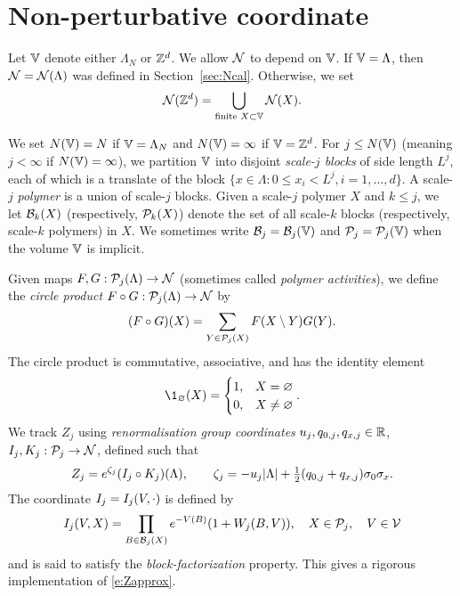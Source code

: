 
\section{Non-perturbative coordinate}
\label{sec:rgcoord}

Let $\mathbb{V}$ denote either $\Lambda_N$ or ${ {{\mathbb Z}}^d }$. We allow $\mathcal{N}$ to depend on
$\mathbb{V}$. If $\mathbb{V} = \Lambda$, then $\mathcal{N} = \mathcal{N}(\Lambda)$ was defined in
Section~\ref{sec:Ncal}. Otherwise, we set
\begin{equation}
\mathcal{N}({ {{\mathbb Z}}^d }) = \bigcup_{\text{finite } X \subset \mathbb{V}} \mathcal{N}(X).
\end{equation}

We set $N(\mathbb{V}) = N$ if
$\mathbb{V} = \Lambda_N$ and $N(\mathbb{V}) = \infty$ if $\mathbb{V} = { {{\mathbb Z}}^d }$.
For $j \le N(\mathbb{V})$ (meaning $j < \infty$ if $N(\mathbb{V}) = \infty$), we partition
$\mathbb{V}$ into disjoint
\emph{scale-$j$ blocks} of side length $L^j$, each of which is a translate of
the block $\{ x \in \Lambda : 0 \le x_i < L^j, i = 1, \ldots, d\}$.
A scale-$j$ \emph{polymer} is a union of scale-$j$ blocks.
Given a scale-$j$ polymer $X$ and $k \le j$, we let $\mathcal{B}_k(X)$
(respectively, $\mathcal{P}_k(X)$)
denote the set of all scale-$k$ blocks (respectively, scale-$k$ polymers) in $X$.
We sometimes write $\mathcal{B}_j = \mathcal{B}_j(\mathbb{V})$ and $\mathcal{P}_j = \mathcal{P}_j(\mathbb{V})$
when the volume $\mathbb{V}$ is implicit.

Given maps $F, G : \mathcal{P}_j(\Lambda) \rightarrow \mathcal{N}$ (sometimes called \emph{polymer activities}),
we define the \emph{circle product} $F \circ G : \mathcal{P}_j(\Lambda) \rightarrow \mathcal{N}$ by
\begin{equation}
\label{e:circ}
(F \circ G)(X) = \sum_{Y\in\mathcal{P}_j(X)} F(X \setminus Y) G(Y).
\end{equation}
The circle product is commutative, associative, and has the identity element
\begin{equation}
\1_\varnothing(X) =
\begin{cases}
1,	& X = \varnothing \\
0,	& X \ne \varnothing
\end{cases}.
\end{equation}
We track $Z_j$ using \emph{renormalisation group coordinates}
$u_j, q_{0,j}, q_{x,j} \in {\mathbb R}$,
$I_j, K_j : \mathcal{P}_j \rightarrow \mathcal{N}$, defined such that
\begin{equation}
\label{e:IcircKnew}
	Z_j = e^{\zeta_j}(I_j\circ K_j)(\Lambda),
	\qquad
	\zeta_j= - u_j|\Lambda|
	+ \textstyle{\frac 12} (q_{0,j} + q_{x,j}) \sigma_0\sigma_x
	.
\end{equation}
The coordinate $I_j = I_j(V, \cdot)$ is defined by
\begin{equation}
\label{e:Idef}
I_j(V, X)
	=
\prod_{B \in \mathcal{B}_j(X)} e^{-V(B)} (1 + W_j(B, V)), \quad X \in \mathcal{P}_j,
	\quad
V \in \mathcal{V}
\end{equation}
and is said to satisfy the \emph{block-factorization} property.
This gives a rigorous implementation of \eqref{e:Zapprox}.

